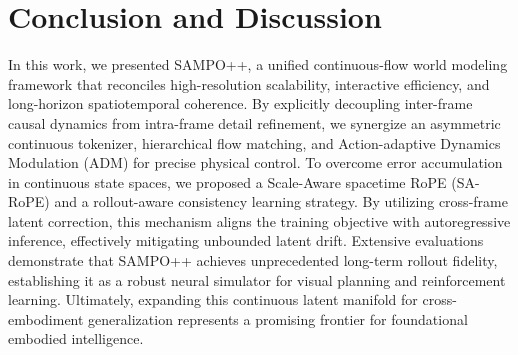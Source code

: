 \section{Conclusion and Discussion}
\label{Sec5:Conclusion}

In this work, we presented SAMPO++, a unified continuous-flow world modeling framework that reconciles high-resolution scalability, interactive efficiency, and long-horizon spatiotemporal coherence. 
By explicitly decoupling inter-frame causal dynamics from intra-frame detail refinement, we synergize an asymmetric continuous tokenizer, hierarchical flow matching, and Action-adaptive Dynamics Modulation (ADM) for precise physical control.
To overcome error accumulation in continuous state spaces, we proposed a Scale-Aware spacetime RoPE (SA-RoPE) and a rollout-aware consistency learning strategy. By utilizing cross-frame latent correction, this mechanism aligns the training objective with autoregressive inference, effectively mitigating unbounded latent drift. 
Extensive evaluations demonstrate that SAMPO++ achieves unprecedented long-term rollout fidelity, establishing it as a robust neural simulator for visual planning and reinforcement learning.
Ultimately, expanding this continuous latent manifold for cross-embodiment generalization represents a promising frontier for foundational embodied intelligence.



\newpage
